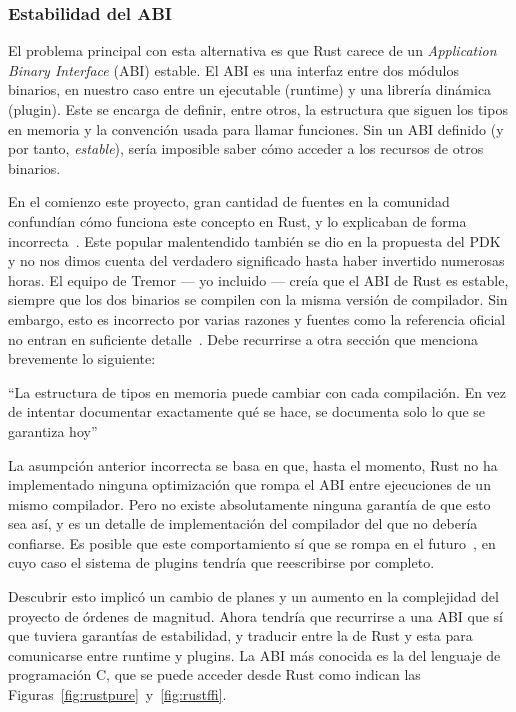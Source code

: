\subsubsection{Estabilidad del ABI}\label{sec:abi}

El problema principal con esta alternativa es que Rust carece de un
\emph{Application Binary Interface} (ABI) estable. El ABI es una interfaz entre
dos módulos binarios, en nuestro caso entre un ejecutable (runtime) y una
librería dinámica (plugin). Este se encarga de definir, entre otros, la
estructura que siguen los tipos en memoria y la convención usada para llamar
funciones. Sin un ABI definido (y por tanto, \emph{estable}), sería imposible
saber cómo acceder a los recursos de otros binarios.

En el comienzo este proyecto, gran cantidad de fuentes en la comunidad
confundían cómo funciona este concepto en Rust, y lo explicaban de forma
incorrecta~\cite{wrongabi1}\cite{wrongabi2}\cite{wrongabi3}\cite{wrongabi4}.
Este popular malentendido también se dio en la propuesta del PDK y no nos dimos
cuenta del verdadero significado hasta haber invertido numerosas horas. El
equipo de Tremor --- yo incluido --- creía que el ABI de Rust es estable,
siempre que los dos binarios se compilen con la misma versión de compilador. Sin
embargo, esto es incorrecto por varias razones y fuentes como la referencia
oficial no entran en suficiente detalle~\cite{refabi_abi}. Debe recurrirse a
otra sección que menciona brevemente lo siguiente:

``La estructura de tipos en memoria puede cambiar con cada compilación. En vez
de intentar documentar exactamente qué se hace, se documenta solo lo que se
garantiza hoy''~\cite{refabi_layout}

La asumpción anterior incorrecta se basa en que, hasta el momento, Rust no ha
implementado ninguna optimización que rompa el ABI entre ejecuciones de un mismo
compilador. Pero no existe absolutamente ninguna garantía de que esto sea así, y
es un detalle de implementación del compilador del que no debería confiarse. Es
posible que este comportamiento sí que se rompa en el
futuro~\cite{randomizelayout}, en cuyo caso el sistema de plugins tendría que
reescribirse por completo.

Descubrir esto implicó un cambio de planes y un aumento en la complejidad del
proyecto de órdenes de magnitud. Ahora tendría que recurrirse a una ABI que sí
que tuviera garantías de estabilidad, y traducir entre la de Rust y esta para
comunicarse entre runtime y plugins. La ABI más conocida es la del lenguaje de
programación C, que se puede acceder desde Rust como indican las
Figuras~\ref{fig:rustpure}~y~\ref{fig:rustffi}.

